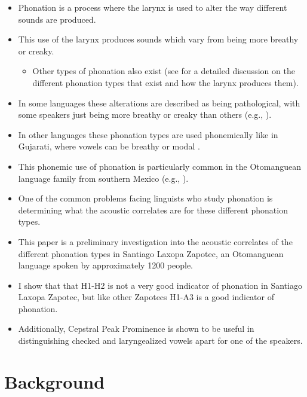 \documentclass[12pt, letterpaper]{article}
\begin{document}
\begin{itemize}
    \item Phonation is a process where the larynx is used to alter the way different sounds are produced. 
	\item This use of the larynx produces sounds which vary from being more breathy or creaky.
	\begin{itemize}
		\item Other types of phonation also exist (see \cite{eslingVoiceQualityLaryngeal2019} for a detailed discussion on the different phonation types that exist and how the larynx produces them).
	\end{itemize} 
	\item In some languages these alterations are described as being pathological, with some speakers just being more breathy or creaky than others (e.g., \cite{klattAnalysisSynthesisPerception1990}). 
    \item In other languages these phonation types are used phonemically like in Gujarati, where vowels can be breathy or modal \citep{fischer-jorgensenPhoneticAnalysisBreathy1968}. 
    \item This phonemic use of phonation is particularly common in the Otomanguean language family from southern Mexico (e.g., \cite{suarezMesoamericanIndianLanguages1983,campbellMesoAmericaLinguisticArea1986,silvermanLaryngealComplexityOtomanguean1997,campbellOtomangueanHistoricalLinguistics2017a,campbellOtomangueanHistoricalLinguistics2017}).
    \item One of the common problems facing linguists who study phonation is determining what the acoustic correlates are for these different phonation types. 
    \item This paper is a preliminary investigation into the acoustic correlates of the different phonation types in Santiago Laxopa Zapotec, an Otomanguean language spoken by approximately 1200 people.
    \item I show that that H1-H2 is not a very good indicator of phonation in Santiago Laxopa Zapotec, but like other Zapotecs H1-A3 is a good indicator of phonation. 
    \item Additionally, Cepstral Peak Prominence is shown to be useful in distinguishing checked and laryngealized vowels apart for one of the speakers.
\end{itemize}

\section{Background} \label{sec:Background}
\end{document}
